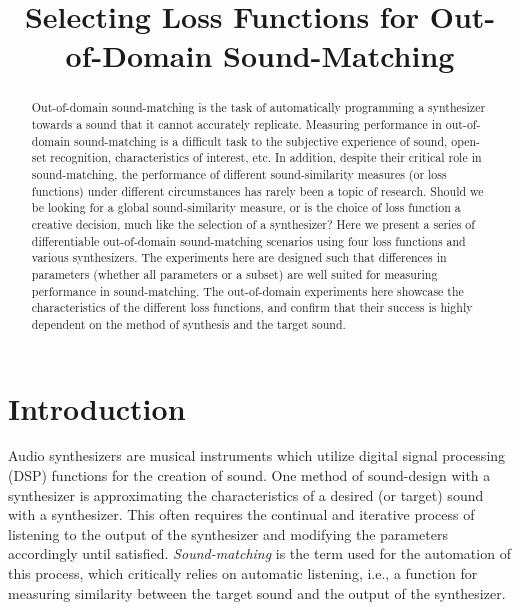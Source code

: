 \documentclass{article} %
\title{Selecting Loss Functions for Out-of-Domain Sound-Matching}
\begin{document}

\address{University of Alberta}

\maketitle


\begin{abstract}
 Out-of-domain sound-matching is the task of automatically programming a synthesizer towards a sound that it cannot accurately replicate. Measuring performance in out-of-domain sound-matching is a difficult task to the subjective experience of sound, open-set recognition, characteristics of interest, etc. In addition, despite their critical role in sound-matching, the performance of different sound-similarity measures (or loss functions) under different circumstances has rarely been a topic of research. Should we be looking for a global sound-similarity measure, or is the choice of loss function a creative decision, much like the selection of a synthesizer?
 Here we present a series of differentiable out-of-domain sound-matching scenarios using four loss functions and various synthesizers. The experiments here are designed such that differences in parameters (whether all parameters or a subset) are well suited for measuring performance in sound-matching. The out-of-domain experiments here showcase the characteristics of the different loss functions, and confirm that their success is highly dependent on the method of synthesis and the target sound. 
\end{abstract}

\section{Introduction}
Audio synthesizers are musical instruments which utilize digital signal processing (DSP) functions for the creation of sound.  One method of sound-design with a synthesizer is approximating the characteristics of a desired (or target) sound with a synthesizer. This often requires the continual and iterative process of listening to the output of the synthesizer and modifying the parameters accordingly until satisfied. \textit{Sound-matching} is the term used for the automation of this process, which critically relies on automatic listening, i.e., a function for measuring similarity between the target sound and the output of the synthesizer. 
\end{document}
